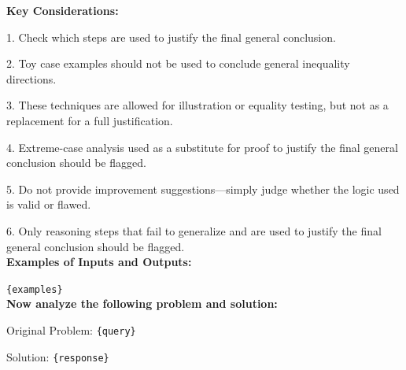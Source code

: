 \begin{textcolorbox}
\textbf{Key Considerations:}

1. Check which steps are used to justify the final general conclusion.

2. Toy case examples should not be used to conclude general inequality directions.

3. These techniques are allowed for illustration or equality testing, but not as a replacement for a full justification.

4. Extreme-case analysis used as a substitute for proof to justify the final general conclusion should be flagged.

5. Do not provide improvement suggestions---simply judge whether the logic used is valid or flawed.

6. Only reasoning steps that fail to generalize and are used to justify the final general conclusion should be flagged.\\

\textbf{Examples of Inputs and Outputs:}

\texttt{\{examples\}}\\

\textbf{Now analyze the following problem and solution:}

Original Problem:
\texttt{\{query\}}

Solution:
\texttt{\{response\}}

\end{textcolorbox}


